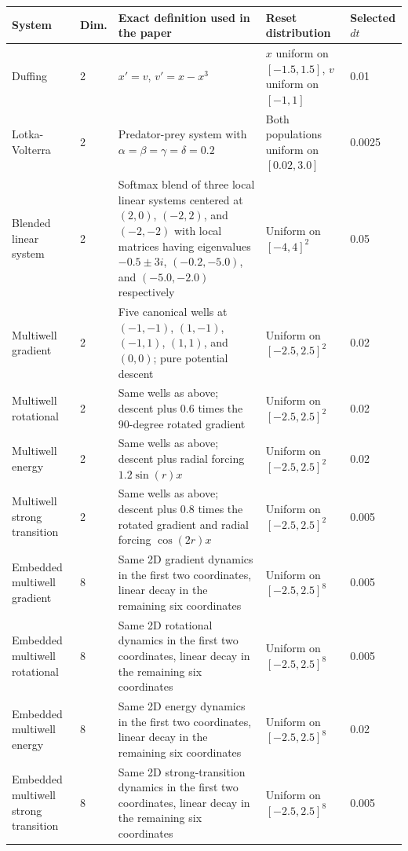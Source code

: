 \begin{table}[ht]
\centering
\scriptsize
\setlength{\tabcolsep}{4pt}
\begin{tabular}{p{}p{}p{}p{}p{}}
\toprule
System & Dim. & Exact definition used in the paper & Reset distribution & Selected $dt$ \\
\midrule
Duffing & 2 & $x' = v$, $v' = x - x^3$ & $x$ uniform on $[-1.5, 1.5]$, $v$ uniform on $[-1, 1]$ & 0.01 \\
Lotka-Volterra & 2 & Predator-prey system with $\alpha = \beta = \gamma = \delta = 0.2$ & Both populations uniform on $[0.02, 3.0]$ & 0.0025 \\
Blended linear system & 2 & Softmax blend of three local linear systems centered at $(2,0)$, $(-2,2)$, and $(-2,-2)$ with local matrices having eigenvalues $-0.5 \pm 3i$, $(-0.2,-5.0)$, and $(-5.0,-2.0)$ respectively & Uniform on $[-4,4]^2$ & 0.05 \\
Multiwell gradient & 2 & Five canonical wells at $(-1,-1)$, $(1,-1)$, $(-1,1)$, $(1,1)$, and $(0,0)$; pure potential descent & Uniform on $[-2.5,2.5]^2$ & 0.02 \\
Multiwell rotational & 2 & Same wells as above; descent plus 0.6 times the 90-degree rotated gradient & Uniform on $[-2.5,2.5]^2$ & 0.02 \\
Multiwell energy & 2 & Same wells as above; descent plus radial forcing $1.2 \sin(r) x$ & Uniform on $[-2.5,2.5]^2$ & 0.02 \\
Multiwell strong transition & 2 & Same wells as above; descent plus 0.8 times the rotated gradient and radial forcing $\cos(2r) x$ & Uniform on $[-2.5,2.5]^2$ & 0.005 \\
Embedded multiwell gradient & 8 & Same 2D gradient dynamics in the first two coordinates, linear decay in the remaining six coordinates & Uniform on $[-2.5,2.5]^8$ & 0.005 \\
Embedded multiwell rotational & 8 & Same 2D rotational dynamics in the first two coordinates, linear decay in the remaining six coordinates & Uniform on $[-2.5,2.5]^8$ & 0.005 \\
Embedded multiwell energy & 8 & Same 2D energy dynamics in the first two coordinates, linear decay in the remaining six coordinates & Uniform on $[-2.5,2.5]^8$ & 0.02 \\
Embedded multiwell strong transition & 8 & Same 2D strong-transition dynamics in the first two coordinates, linear decay in the remaining six coordinates & Uniform on $[-2.5,2.5]^8$ & 0.005 \\

\end{tabular}
\end{table}
